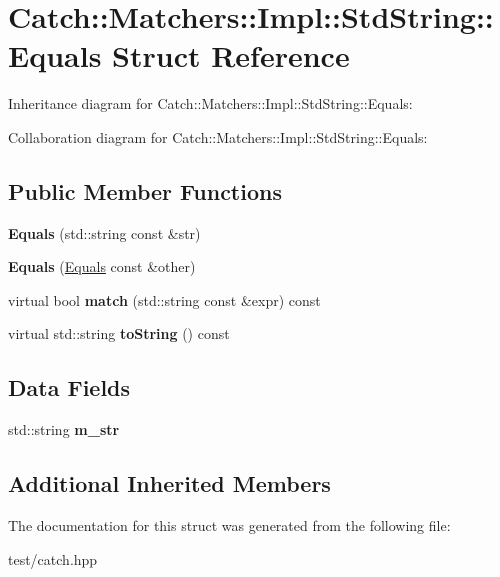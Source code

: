 \hypertarget{structCatch_1_1Matchers_1_1Impl_1_1StdString_1_1Equals}{}\section{Catch\+:\+:Matchers\+:\+:Impl\+:\+:Std\+String\+:\+:Equals Struct Reference}
\label{structCatch_1_1Matchers_1_1Impl_1_1StdString_1_1Equals}


Inheritance diagram for Catch\+:\+:Matchers\+:\+:Impl\+:\+:Std\+String\+:\+:Equals\+:


Collaboration diagram for Catch\+:\+:Matchers\+:\+:Impl\+:\+:Std\+String\+:\+:Equals\+:
\subsection*{Public Member Functions}
\begin{DoxyCompactItemize}
\item 
{\bfseries Equals} (std\+::string const \&str)\hypertarget{structCatch_1_1Matchers_1_1Impl_1_1StdString_1_1Equals_a1bd99b381c6116a02b1e3ca200ca920c}{}\label{structCatch_1_1Matchers_1_1Impl_1_1StdString_1_1Equals_a1bd99b381c6116a02b1e3ca200ca920c}

\item 
{\bfseries Equals} (\hyperlink{structCatch_1_1Matchers_1_1Impl_1_1StdString_1_1Equals}{Equals} const \&other)\hypertarget{structCatch_1_1Matchers_1_1Impl_1_1StdString_1_1Equals_acaa97de06aedf363ae803d65a975f5e4}{}\label{structCatch_1_1Matchers_1_1Impl_1_1StdString_1_1Equals_acaa97de06aedf363ae803d65a975f5e4}

\item 
virtual bool {\bfseries match} (std\+::string const \&expr) const \hypertarget{structCatch_1_1Matchers_1_1Impl_1_1StdString_1_1Equals_a00c8259a76c24da669e116662ededc70}{}\label{structCatch_1_1Matchers_1_1Impl_1_1StdString_1_1Equals_a00c8259a76c24da669e116662ededc70}

\item 
virtual std\+::string {\bfseries to\+String} () const \hypertarget{structCatch_1_1Matchers_1_1Impl_1_1StdString_1_1Equals_a7a09449ff2f858981caf3b1f6c36d270}{}\label{structCatch_1_1Matchers_1_1Impl_1_1StdString_1_1Equals_a7a09449ff2f858981caf3b1f6c36d270}

\end{DoxyCompactItemize}
\subsection*{Data Fields}
\begin{DoxyCompactItemize}
\item 
std\+::string {\bfseries m\+\_\+str}\hypertarget{structCatch_1_1Matchers_1_1Impl_1_1StdString_1_1Equals_a41fc4413185f47d8b6d8da7a55078921}{}\label{structCatch_1_1Matchers_1_1Impl_1_1StdString_1_1Equals_a41fc4413185f47d8b6d8da7a55078921}

\end{DoxyCompactItemize}
\subsection*{Additional Inherited Members}


The documentation for this struct was generated from the following file\+:\begin{DoxyCompactItemize}
\item 
test/catch.\+hpp\end{DoxyCompactItemize}
